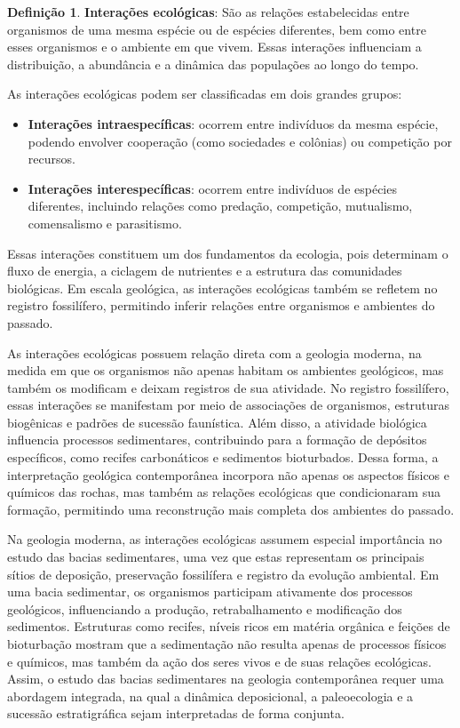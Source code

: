 \documentclass[a4paper,12pt]{article}
\theoremstyle{definition}
\theoremstyle{definition}
\theoremstyle{definition}
\newtheorem{definicao}{Definição}[section]
\begin{document}
\begin{definicao}
\textbf{Interações ecológicas}: São as relações estabelecidas entre organismos de uma mesma espécie ou de espécies diferentes, bem como entre esses organismos e o ambiente em que vivem. Essas interações influenciam a distribuição, a abundância e a dinâmica das populações ao longo do tempo.
\end{definicao}

As interações ecológicas podem ser classificadas em dois grandes grupos:

\begin{itemize}
    \item \textbf{Interações intraespecíficas}: ocorrem entre indivíduos da mesma espécie, podendo envolver cooperação (como sociedades e colônias) ou competição por recursos.

    \item \textbf{Interações interespecíficas}: ocorrem entre indivíduos de espécies diferentes, incluindo relações como predação, competição, mutualismo, comensalismo e parasitismo.
\end{itemize}

Essas interações constituem um dos fundamentos da ecologia, pois determinam o fluxo de energia, a ciclagem de nutrientes e a estrutura das comunidades biológicas. Em escala geológica, as interações ecológicas também se refletem no registro fossilífero, permitindo inferir relações entre organismos e ambientes do passado.

As interações ecológicas possuem relação direta com a geologia moderna, na medida em que os organismos não apenas habitam os ambientes geológicos, mas também os modificam e deixam registros de sua atividade. No registro fossilífero, essas interações se manifestam por meio de associações de organismos, estruturas biogênicas e padrões de sucessão faunística. Além disso, a atividade biológica influencia processos sedimentares, contribuindo para a formação de depósitos específicos, como recifes carbonáticos e sedimentos bioturbados. Dessa forma, a interpretação geológica contemporânea incorpora não apenas os aspectos físicos e químicos das rochas, mas também as relações ecológicas que condicionaram sua formação, permitindo uma reconstrução mais completa dos ambientes do passado.

Na geologia moderna, as interações ecológicas assumem especial importância no estudo das bacias sedimentares, uma vez que estas representam os principais sítios de deposição, preservação fossilífera e registro da evolução ambiental. Em uma bacia sedimentar, os organismos participam ativamente dos processos geológicos, influenciando a produção, retrabalhamento e modificação dos sedimentos. Estruturas como recifes, níveis ricos em matéria orgânica e feições de bioturbação mostram que a sedimentação não resulta apenas de processos físicos e químicos, mas também da ação dos seres vivos e de suas relações ecológicas. Assim, o estudo das bacias sedimentares na geologia contemporânea requer uma abordagem integrada, na qual a dinâmica deposicional, a paleoecologia e a sucessão estratigráfica sejam interpretadas de forma conjunta.
\end{document}
